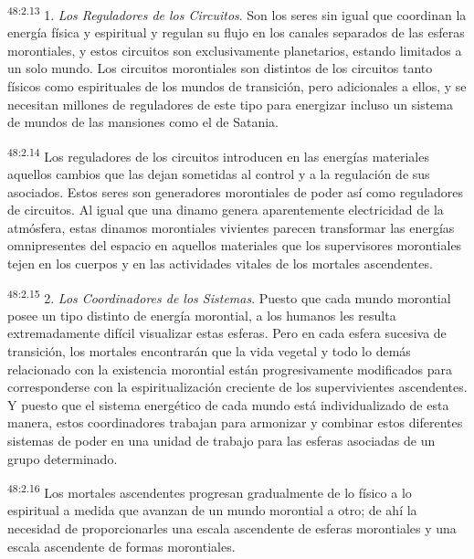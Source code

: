 \par
\textsuperscript{48:2.13} 1. \textit{Los Reguladores de los Circuitos}. Son los seres sin igual que coordinan la energía física y espiritual y regulan su flujo en los canales separados de las esferas morontiales, y estos circuitos son exclusivamente planetarios, estando limitados a un solo mundo. Los circuitos morontiales son distintos de los circuitos tanto físicos como espirituales de los mundos de transición, pero adicionales a ellos, y se necesitan millones de reguladores de este tipo para energizar incluso un sistema de mundos de las mansiones como el de Satania.

\par
\textsuperscript{48:2.14} Los reguladores de los circuitos introducen en las energías materiales aquellos cambios que las dejan sometidas al control y a la regulación de sus asociados. Estos seres son generadores morontiales de poder así como reguladores de circuitos. Al igual que una dinamo genera aparentemente electricidad de la atmósfera, estas dinamos morontiales vivientes parecen transformar las energías omnipresentes del espacio en aquellos materiales que los supervisores morontiales tejen en los cuerpos y en las actividades vitales de los mortales ascendentes.

\par
\textsuperscript{48:2.15} 2. \textit{Los Coordinadores de los Sistemas}. Puesto que cada mundo morontial posee un tipo distinto de energía morontial, a los humanos les resulta extremadamente difícil visualizar estas esferas. Pero en cada esfera sucesiva de transición, los mortales encontrarán que la vida vegetal y todo lo demás relacionado con la existencia morontial están progresivamente modificados para corresponderse con la espiritualización creciente de los supervivientes ascendentes. Y puesto que el sistema energético de cada mundo está individualizado de esta manera, estos coordinadores trabajan para armonizar y combinar estos diferentes sistemas de poder en una unidad de trabajo para las esferas asociadas de un grupo determinado.

\par
\textsuperscript{48:2.16} Los mortales ascendentes progresan gradualmente de lo físico a lo espiritual a medida que avanzan de un mundo morontial a otro; de ahí la necesidad de proporcionarles una escala ascendente de esferas morontiales y una escala ascendente de formas morontiales.

